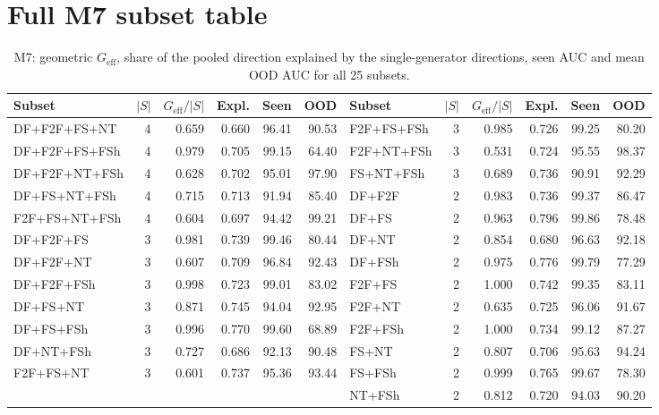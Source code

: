 \documentclass[10pt,a4paper]{article}
\begin{document}
\section{Full M7 subset table}
\begin{table}[H]\centering\scriptsize
\caption{M7: geometric \(G_\text{eff}\), share of the pooled direction explained by the single-generator directions, seen AUC and mean OOD AUC for all 25 subsets.}
\begin{tabular}{@{}lrrrrr|lrrrrr@{}}
\toprule
Subset & \(|S|\) & \(G_\text{eff}/|S|\) & Expl. & Seen & OOD & Subset & \(|S|\) & \(G_\text{eff}/|S|\) & Expl. & Seen & OOD\\
\midrule
DF+F2F+FS+NT & 4 & 0.659 & 0.660 & 96.41 & 90.53 & F2F+FS+FSh & 3 & 0.985 & 0.726 & 99.25 & 80.20\\
DF+F2F+FS+FSh & 4 & 0.979 & 0.705 & 99.15 & 64.40 & F2F+NT+FSh & 3 & 0.531 & 0.724 & 95.55 & 98.37\\
DF+F2F+NT+FSh & 4 & 0.628 & 0.702 & 95.01 & 97.90 & FS+NT+FSh & 3 & 0.689 & 0.736 & 90.91 & 92.29\\
DF+FS+NT+FSh & 4 & 0.715 & 0.713 & 91.94 & 85.40 & DF+F2F & 2 & 0.983 & 0.736 & 99.37 & 86.47\\
F2F+FS+NT+FSh & 4 & 0.604 & 0.697 & 94.42 & 99.21 & DF+FS & 2 & 0.963 & 0.796 & 99.86 & 78.48\\
DF+F2F+FS & 3 & 0.981 & 0.739 & 99.46 & 80.44 & DF+NT & 2 & 0.854 & 0.680 & 96.63 & 92.18\\
DF+F2F+NT & 3 & 0.607 & 0.709 & 96.84 & 92.43 & DF+FSh & 2 & 0.975 & 0.776 & 99.79 & 77.29\\
DF+F2F+FSh & 3 & 0.998 & 0.723 & 99.01 & 83.02 & F2F+FS & 2 & 1.000 & 0.742 & 99.35 & 83.11\\
DF+FS+NT & 3 & 0.871 & 0.745 & 94.04 & 92.95 & F2F+NT & 2 & 0.635 & 0.725 & 96.06 & 91.67\\
DF+FS+FSh & 3 & 0.996 & 0.770 & 99.60 & 68.89 & F2F+FSh & 2 & 1.000 & 0.734 & 99.12 & 87.27\\
DF+NT+FSh & 3 & 0.727 & 0.686 & 92.13 & 90.48 & FS+NT & 2 & 0.807 & 0.706 & 95.63 & 94.24\\
F2F+FS+NT & 3 & 0.601 & 0.737 & 95.36 & 93.44 & FS+FSh & 2 & 0.999 & 0.765 & 99.67 & 78.30\\
 & & & & & & NT+FSh & 2 & 0.812 & 0.720 & 94.03 & 90.20\\
\bottomrule
\end{tabular}
\end{table}
\end{document}
